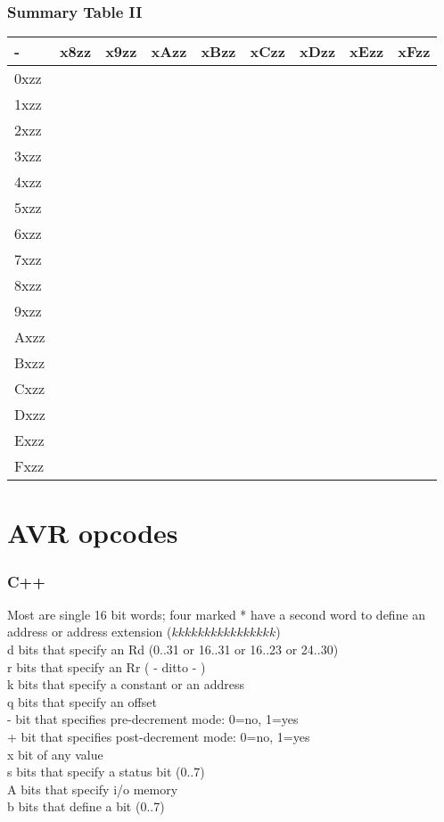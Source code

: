 \documentclass{beamer}
\begin{document}
\begin{frame}
\frametitle{Summary Table II}
\small
\begin{center}
    \begin{tabular}{| l | l | l | l | l | l | l | l | l |}
    \hline
    - & x8zz & x9zz & xAzz & xBzz & xCzz & xDzz & xEzz & xFzz \\    \hline
    0xzz & & & & & & & & \\ \hline
    1xzz & & & & & & & & \\ \hline
    2xzz & & & & & & & & \\ \hline
    3xzz & & & & & & & & \\ \hline
    4xzz & & & & & & & & \\ \hline
    5xzz & & & & & & & & \\ \hline
    6xzz & & & & & & & & \\ \hline
    7xzz & & & & & & & & \\ \hline
    8xzz & & & & & & & & \\ \hline
    9xzz & & & & & & & & \\ \hline
    Axzz & & & & & & & & \\ \hline
    Bxzz & & & & & & & & \\ \hline
    Cxzz & & & & & & & & \\ \hline
    Dxzz & & & & & & & & \\ \hline
    Exzz & & & & & & & & \\ \hline
    Fxzz & & & & & & & & \\ \hline
    \end{tabular}
\end{center}
\end{frame}

\section{AVR opcodes}
\begin{frame}
\frametitle{C++}

Most are single 16 bit words; four marked * have a second word
to define an address or address extension ($kkkk kkkk kkkk kkkk$)
\\
  d  bits that specify an Rd (0..31 or 16..31 or 16..23 or 24..30)\\
  r  bits that specify an Rr ( - ditto - )\\
  k  bits that specify a constant or an address\\
  q  bits that specify an offset\\
  -  bit that specifies pre-decrement mode: 0=no, 1=yes\\
  +  bit that specifies post-decrement mode: 0=no, 1=yes\\
  x  bit of any value\\
  s  bits that specify a status bit (0..7)\\
  A  bits that specify i/o memory\\
  b  bits that define a bit (0..7)\\

\end{frame}
\end{document}
